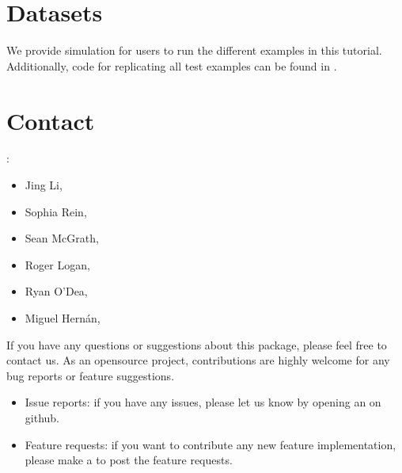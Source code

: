 \documentclass[letterpaper,10pt,english]{sphinxmanual}
\begin{document}
\chapter{Datasets}
\label{\detokenize{Datasets:datasets}}\label{\detokenize{Datasets::doc}}
\sphinxAtStartPar
We provide simulation  for
users to run the different examples in this tutorial.
Additionally, code for replicating all test examples can be found in .


\chapter{Contact}
\label{\detokenize{Contact:contact}}\label{\detokenize{Contact::doc}}
\sphinxAtStartPar
{}:
\begin{itemize}
\item {} 
\sphinxAtStartPar
Jing Li, 

\item {} 
\sphinxAtStartPar
Sophia Rein, 

\item {} 
\sphinxAtStartPar
Sean McGrath, 

\item {} 
\sphinxAtStartPar
Roger Logan, 

\item {} 
\sphinxAtStartPar
Ryan O’Dea, 

\item {} 
\sphinxAtStartPar
Miguel Hernán, 

\end{itemize}

\sphinxAtStartPar
If you have any questions or suggestions about this package, please feel free to contact us.
As an open\sphinxhyphen{}source project, contributions are highly welcome for any bug reports or
feature suggestions.
\begin{itemize}
\item {} 
\sphinxAtStartPar
Issue reports: if you have any issues, please let us know by opening an 
on github.

\item {} 
\sphinxAtStartPar
Feature requests: if you want to contribute any new feature implementation, please make a
 to post the feature requests.

\end{itemize}
\end{document}
